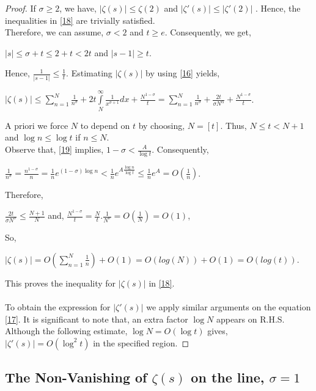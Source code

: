 \documentclass[article,12pt]{elsarticle}
\begin{document}
	\begin{proof}
		If $\sigma \geq 2$, we have, $|\zeta (s)|\leq \zeta(2)$ and $|\zeta'(s)|\leq |\zeta'(2)|$ . Hence, the inequalities in \eqref{18} are trivially satisfied. \\
		Therefore, we can assume, $\sigma<2$ and $t\geq e$. Consequently, we get,
		\begin{center}
			$|s|\leq \sigma +t\leq 2+t< 2t$ and    $|s-1|\geq t$.
		\end{center}
		Hence, $\frac{1}{|s-1|}\leq \frac{1}{t}$. Estimating $|\zeta (s)|$ by using \eqref{16} yields,
		\begin{center}
			$|\zeta(s)|\leq \sum\limits_{n=1}^{N}\frac{1}{n^{\sigma}}+ 2t\int\limits_{N}^{\infty}\frac{1}{x^{\sigma+1}}dx+ \frac{N^{1-\sigma}}{t}=\sum\limits_{n=1}^{N}\frac{1}{n^{\sigma}}+\frac{2t}{\sigma N^{\alpha}}+ \frac{N^{1-\sigma}}{t}$.
		\end{center}
		A priori we force $N$ to depend on $t$ by choosing, $N=[t]$. Thus, $N\leq t<N+1$ and $\log n\leq \log t$ if $n\leq N$.\\
		Observe that, \eqref{19} implies, $1-\sigma< \frac{A}{\log t}$. Consequently,
		\begin{center}
			$\frac{1}{n^{\sigma}}=\frac{n^{1-\sigma}}{n}=\frac{1}{n}e^{(1-\sigma)\log n}<\frac{1}{n}e^{A\frac{\log n}{\log t}}\leq \frac{1}{n}e^{A}=O(\frac{1}{n})$.
		\end{center}
		Therefore,
		\begin{center}
			$	\frac{2t}{\sigma N^{\sigma}}\leq \frac{N+1}{N}$ and,  $\frac{N^{1-\sigma}}{t}=\frac{N}{t}.\frac{1}{N^{\sigma}}=O(\frac{1}{N})=O(1)$,
		\end{center}	
		So,
		\begin{center}
			$|\zeta(s)|=O\left(\sum\limits_{n=1}^{N}\frac{1}{n}\right)+O(1)=O(log(N))+O(1)=O(log(t))$.
		\end{center}	
		This proves the inequality for $|\zeta(s)|$ in \eqref{18}.\\\\
		To obtain the expression for $|\zeta'(s)|$ we apply similar arguments on the equation \eqref{17}. It is significant to note that, an extra factor $\log N$ appears on R.H.S. Although the following estimate, $\log N=O(\log t)$ gives,   $|\zeta'(s)|=O(\log^{2} t)$ in the specified region.
		
	\end{proof}
	
	\subsection{The Non-Vanishing of $\zeta(s)$ on the line, $\sigma=1$}
	
\end{document}
